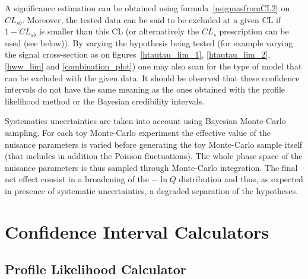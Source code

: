 \documentclass[11pt]{article}
\begin{document}
A significance estimation can be obtained using formula~\ref{nsigmasfromCL2} on
$CL_{sb}$. Moreover, the tested data can be said to be excluded at a
given CL if $1-CL_{sb}$ is smaller than this CL (or alternatively the
$CL_s$ prescription can be used (see below)). By varying the
hypothesis being tested (for example varying the signal cross-section
as on figures~\ref{htautau_lim_1}, \ref{htautau_lim_2}, \ref{hww_lim}
and \ref{combination_plot}) one may also scan for the type of model
that can be excluded with the given data.
It should be observed that these confidence intervals do not have the
same meaning as the ones obtained with the profile likelihood method
or the Bayesian credibility intervals.
\par
Systematics uncertainties are taken into account  using Bayesian
Monte-Carlo sampling.
For each toy Monte-Carlo experiment the effective value 
of the nuisance parameters is varied before generating the toy Monte-Carlo sample itself 
(that includes in addition the Poisson fluctuations).
The whole phase space of the nuisance parameters is thus sampled through
Monte-Carlo integration. The final net effect consist in a broadening
of the $-\ln Q$ distribution and thus, as expected in presence of
systematic uncertainties, a degraded separation of the hypotheses.


\section{Confidence Interval Calculators}

	\subsection{Profile Likelihood Calculator}\label{S:ProfileLikelihoodRatio}
\end{document}
